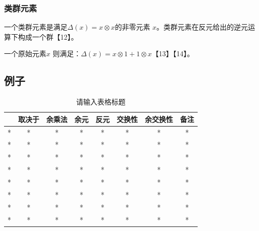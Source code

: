 \subsubsection{类群元素}
一个类群元素是满足$\Delta(x) = x \otimes x$的非零元素 $x$。类群元素在反元给出的逆元运算下构成一个群【12】。

一个原始元素$x$ 则满足：$\Delta(x) = x \otimes 1 + 1 \otimes x$【13】【14】。 
\subsection{例子}
\begin{table}[ht]
\centering
\caption{请输入表格标题}\label{tab_HPFds1}
\begin{tabular}{|c|c|c|c|c|c|c|c|}
\hline
 & \textbf{取决于} & \textbf{余乘法} & \textbf{余元} & \textbf{反元} & \textbf{交换性} & \textbf{余交换性} & \textbf{备注} \\
\hline
* & * & * & * & * & * & * & * \\
\hline
* & * & * & * & * & * & * & * \\
\hline
* & * & * & * & * & * & * & * \\
\hline
* & * & * & * & * & * & * & * \\
\hline
* & * & * & * & * & * & * & * \\
\hline
* & * & * & * & * & * & * & * \\
\hline
* & * & * & * & * & * & * & * \\
\hline
* & * & * & * & * & * & * & * \\
\hline
\end{tabular}
\end{table}


